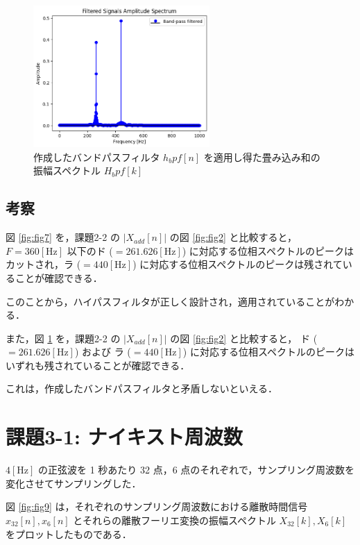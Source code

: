 \documentclass[fleqn, a4paper. 12pt]{jsarticle}
\begin{document}
    \begin{figure}[!h]
      \centering
      \includegraphics[width=0.6\textwidth]{fig_27.png}
      \caption{作成したバンドパスフィルタ $h_bpf[n]$ を適用し得た畳み込み和の振幅スペクトル $H_bpf[k]$}
      \label{fig:fig8}
    \end{figure}
  
    \subsection*{考察}
    
      図 \ref{fig:fig7} を，課題2-2 の $|X_{add}[n]|$ の図 \ref{fig:fig2} と比較すると， $F = 360 [\mathrm{Hz}]$ 以下のド ($ = 261.626 [\mathrm{Hz}]$) に対応する位相スペクトルのピークはカットされ，ラ ($ = 440 [\mathrm{Hz}]$) に対応する位相スペクトルのピークは残されていることが確認できる．
  
      このことから，ハイパスフィルタが正しく設計され，適用されていることがわかる．

      また，図 \ref{fig:fig8} を，課題2-2 の $|X_{add}[n]|$ の図 \ref{fig:fig2} と比較すると， ド ($ = 261.626 [\mathrm{Hz}]$) および ラ ($ = 440 [\mathrm{Hz}]$) に対応する位相スペクトルのピークはいずれも残されていることが確認できる．

      これは，作成したバンドパスフィルタと矛盾しないといえる．

  \newpage

  \section*{課題3-1: ナイキスト周波数}

  $4 [\mathrm{Hz}]$ の正弦波を 1 秒あたり 32 点，6 点のそれぞれで，サンプリング周波数を変化させてサンプリングした．

  図 \ref{fig:fig9} は，それぞれのサンプリング周波数における離散時間信号 $x_{32}[n], x_{6}[n]$ とそれらの離散フーリエ変換の振幅スペクトル $X_{32}[k], X_{6}[k]$ をプロットしたものである．
\end{document}
